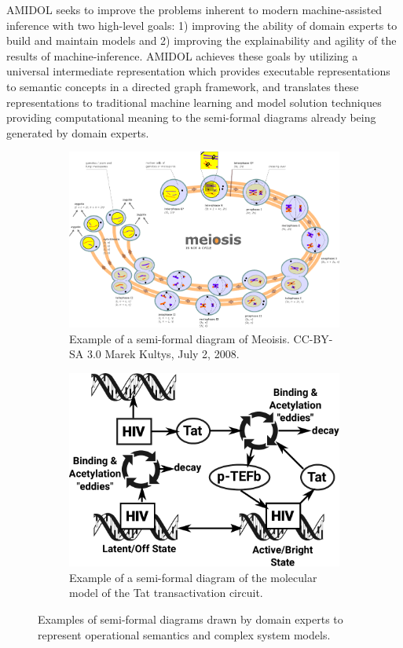 \documentclass[11pt]{article}
\newcommand{\amidol}{\textsc{AMIDOL}}
\begin{document}
\amidol{} seeks to improve the problems inherent to modern machine-assisted inference with two high-level goals: 1) improving the ability of domain experts to build and maintain models and 2) improving the explainability and agility of the results of machine-inference.  \amidol{} achieves these goals by utilizing a universal intermediate representation which provides executable representations to semantic concepts in a directed graph framework, and translates these representations to traditional machine learning and model solution techniques providing computational meaning to the semi-formal diagrams already being generated by domain experts.

\begin{figure}
  \centering
  \begin{subfigure}[b]{0.48\textwidth}
    \includegraphics[width=\textwidth]{figs/Diagram_of_meiosis.pdf}
    \caption{Example of a semi-formal diagram of Meoisis. CC-BY-SA 3.0 Marek Kultys, July 2, 2008.}
    \label{Fig:Meiosis}
  \end{subfigure}
  \begin{subfigure}[b]{0.48\textwidth}
    \includegraphics[width=\textwidth]{figs/HIV-Tat-figure.pdf}
    \caption{Example of a semi-formal diagram of the molecular model of the Tat transactivation circuit.}
    \label{Fig:HIV-Tat}
  \end{subfigure}
  \caption{Examples of semi-formal diagrams drawn by domain experts to represent operational semantics and complex
  system models.}
  \label{Fig:Semi-formal}
\end{figure}
\end{document}
